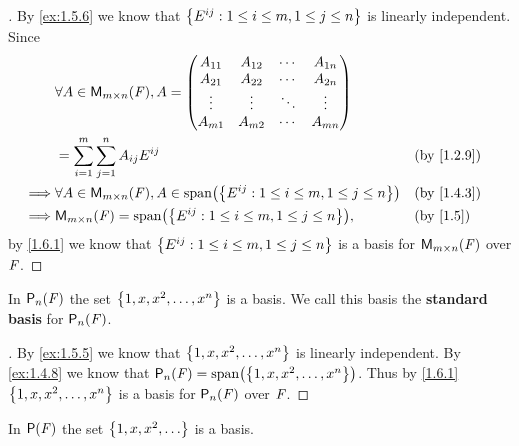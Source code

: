 \begin{proof}[]
  By \cref{ex:1.5.6} we know that \(\left\lbrace E^{i j} : 1 \leq i \leq m, 1 \leq j \leq n\right\rbrace\) is linearly independent.
  Since
  \begin{align*}
             & \forall A \in \MS, A = \begin{pmatrix}
      A_{1 1} & A_{1 2} & \cdots & A_{1 n} \\
      A_{2 1} & A_{2 2} & \cdots & A_{2 n} \\
      \vdots  & \vdots  & \ddots & \vdots  \\
      A_{m 1} & A_{m 2} & \cdots & A_{m n}
    \end{pmatrix}                                                              \\
             & = \sum_{i = 1}^m \sum_{j = 1}^n A_{i j} E^{i j}                                 &  & \text{(by \cref{1.2.9})} \\
    \implies & \forall A \in \MS, A \in \spn{\set{E^{i j} : 1 \leq i \leq m, 1 \leq j \leq n}} &  & \text{(by \cref{1.4.3})} \\
    \implies & \MS = \spn{\set{E^{i j} : 1 \leq i \leq m, 1 \leq j \leq n}},                   &  & \text{(by \cref{1.5})}
  \end{align*}
  by \cref{1.6.1} we know that \(\left\lbrace E^{i j} : 1 \leq i \leq m, 1 \leq j \leq n\right\rbrace\) is a basis for \(\mathsf{M}_{{m} \times n}({\mathit{F}})\) over \(\mathit{F}\).
\end{proof}

\begin{eg}\label{1.6.5}
  In \(\ps[n]{\F}\) the set \(\left\lbrace1, x, x^2, \dots, x^n\right\rbrace\) is a basis.
  We call this basis the \textbf{standard basis} for \(\ps[n]{\F}\).
\end{eg}

\begin{proof}[]
  By \cref{ex:1.5.5} we know that \(\left\lbrace1, x, x^2, \dots, x^n\right\rbrace\) is linearly independent.
  By \cref{ex:1.4.8} we know that \(\ps[n]{\F} = \spn{\set{1, x, x^2, \dots, x^n}}\).
  Thus by \cref{1.6.1} \(\left\lbrace1, x, x^2, \dots, x^n\right\rbrace\) is a basis for \(\ps[n]{\F}\) over \(\mathit{F}\).
\end{proof}

\begin{eg}\label{1.6.6}
  In \(\ps{\F}\) the set \(\set{1, x, x^2, \dots}\) is a basis.
\end{eg}


